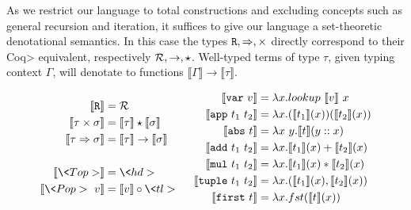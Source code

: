   As we restrict our language to total constructions and excluding concepts such as general recursion and iteration, it suffices to give our language a set-theoretic denotational semantics.
  In this case the types $\texttt{R}, \Rightarrow, \times$ directly correspond to their \<Coq> equivalent, respectively $\mathcal{R}, \rightarrow, \star$.
  Well-typed terms of type $\tau$, given typing context $\Gamma$, will denotate to functions $\llbracket \Gamma \rrbracket \to \llbracket \tau \rrbracket$.

  \begin{figure}
    \centering
    \begin{gather*}
      \begin{aligned}
        \llbracket \synR \rrbracket &= \denR \\
        \llbracket \tau \synStar \sigma \rrbracket &=
          \llbracket \tau \rrbracket \denStar \llbracket \sigma \rrbracket \\
        \llbracket \tau \synFunc \sigma \rrbracket &= \llbracket \tau \rrbracket \denFunc \llbracket \sigma \rrbracket \\
        \\
        \llbracket \<Top> \rrbracket &= \<hd> \\
        \llbracket \<Pop>\ v \rrbracket &= \llbracket v \rrbracket \circ \<tl> \\
      \end{aligned}
      \;\;\;\;\;\;
      \begin{aligned}
        \llbracket \var{v} \rrbracket &=
          \lambda x. lookup\ \llbracket v \rrbracket\ x \\
        \llbracket \app{t_1}{t_2} \rrbracket &=
          \lambda x. (\llbracket t_1 \rrbracket(x)) (\llbracket t_2 \rrbracket(x)) \\
        \llbracket \abs{t} \rrbracket &=
          \lambda x\ y. \llbracket t \rrbracket(y :: x) \\
        \llbracket \add{t_1}{t_2} \rrbracket &=
          \lambda x. \llbracket t_1 \rrbracket(x) + \llbracket t_2 \rrbracket(x) \\
        \llbracket \mul{t_1}{t_2} \rrbracket &=
          \lambda x. \llbracket t_1 \rrbracket(x) * \llbracket t_2 \rrbracket(x) \\
        \llbracket \tuple{t_1}{t_2} \rrbracket &=
          \lambda x. (\llbracket t_1 \rrbracket(x), \llbracket t_2 \rrbracket(x)) \\
        \llbracket \first{t} \rrbracket &=
          \lambda x. fst(\llbracket t \rrbracket(x)) \\

\end{aligned}
\end{gather*}
\end{figure}
